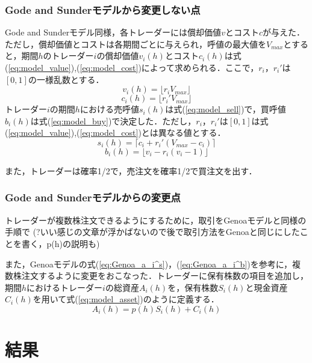 \documentclass[titlepage]{jsreport}
\begin{document}
\subsection{Gode and Sunderモデルから変更しない点}
Gode and Sunderモデル同様，各トレーダーには償却価値$v$とコスト$c$が与えた．ただし，償却価値とコストは各期間ごとに与えられ，呼値の最大値を$V_{max}$とすると，期間$h$のトレーダー$i$の償却価値$v_i(h)$とコスト$c_i(h)$は式(\ref{eq:model_value}),(\ref{eq:model_cost})によって求められる．ここで，$r_i$，$r_i'$は$[0, 1]$の一様乱数とする．
\begin{equation}
    v_i(h) = \lfloor r_i V_{max} \rfloor \label{eq:model_value}
\end{equation}
\begin{equation}
    c_i(h) = \lfloor r_i' V_{max} \rfloor \label{eq:model_cost}
\end{equation}
トレーダー$i$の期間$h$における売呼値$s_i(h)$は式(\ref{eq:model_sell})で，買呼値$b_i(h)$は式(\ref{eq:model_buy})で決定した．ただし，$r_i$，$r_i'$は$[0, 1]$は式(\ref{eq:model_value}),(\ref{eq:model_cost})とは異なる値とする．
\begin{equation}
    s_i(h) = \lceil c_i + r_i' (V_{max} - c_i) \rceil \label{eq:model_sell}
\end{equation}
\begin{equation}
    b_i(h) = \lfloor v_i - r_i (v_i - 1) \rfloor \label{eq:model_buy}
\end{equation}

また，トレーダーは確率1/2で，売注文を確率1/2で買注文を出す．

\subsection{Gode and Sunderモデルからの変更点}
トレーダーが複数株注文できるようにするために，取引をGenoaモデルと同様の手順で
(?いい感じの文章が浮かばないので後で取引方法をGenoaと同じにしたことを書く，p(h)の説明も)

また，Genoaモデルの式(\ref{eq:Genoa_a_i^s})，(\ref{eq:Genoa_a_i^b})を参考に，複数株注文するように変更をおこなった．トレーダーに保有株数の項目を追加し，期間$h$におけるトレーダー$i$の総資産$A_i(h)$を，保有株数$S_i(h)$と現金資産$C_i(h)$を用いて式(\ref{eq:model_asset})のように定義する．
\begin{equation}
    A_i(h) = p(h) S_i(h) + C_i(h) \label{eq:model_asset}
\end{equation}



\chapter{結果} \label{chap:results}
\end{document}
